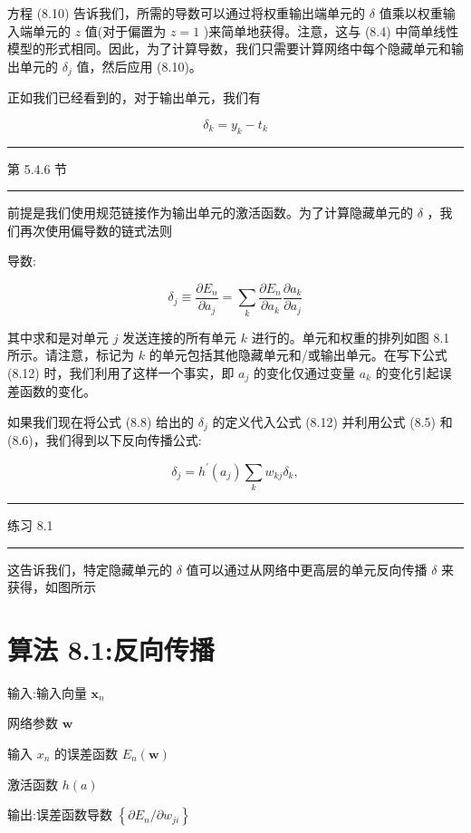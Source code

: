 \documentclass[10pt]{article}
\newcommand{\HRule}{\begin{center}\rule{0.9\linewidth}{0.2mm}\end{center}}
\begin{document}
方程 (8.10) 告诉我们，所需的导数可以通过将权重输出端单元的 \(\delta\) 值乘以权重输入端单元的 \(z\) 值(对于偏置为 \(z = 1\) )来简单地获得。注意，这与 (8.4) 中简单线性模型的形式相同。因此，为了计算导数，我们只需要计算网络中每个隐藏单元和输出单元的 \({\delta }_{j}\) 值，然后应用 (8.10)。

正如我们已经看到的，对于输出单元，我们有

\[
{\delta }_{k} = {y}_{k} - {t}_{k} \tag{8.11}
\]

\HRule

第 5.4.6 节

\HRule

前提是我们使用规范链接作为输出单元的激活函数。为了计算隐藏单元的 \(\delta\) ，我们再次使用偏导数的链式法则

导数:

\[
{\delta }_{j} \equiv  \frac{\partial {E}_{n}}{\partial {a}_{j}} = \mathop{\sum }\limits_{k}\frac{\partial {E}_{n}}{\partial {a}_{k}}\frac{\partial {a}_{k}}{\partial {a}_{j}} \tag{8.12}
\]

其中求和是对单元 \(j\) 发送连接的所有单元 \(k\) 进行的。单元和权重的排列如图 8.1 所示。请注意，标记为 \(k\) 的单元包括其他隐藏单元和/或输出单元。在写下公式 (8.12) 时，我们利用了这样一个事实，即 \({a}_{j}\) 的变化仅通过变量 \({a}_{k}\) 的变化引起误差函数的变化。

如果我们现在将公式 (8.8) 给出的 \({\delta }_{j}\) 的定义代入公式 (8.12) 并利用公式 (8.5) 和 (8.6)，我们得到以下反向传播公式:

\[
{\delta }_{j} = {h}^{\prime }\left( {a}_{j}\right) \mathop{\sum }\limits_{k}{w}_{kj}{\delta }_{k}, \tag{8.13}
\]

\HRule

练习 8.1

\HRule

这告诉我们，特定隐藏单元的 \(\delta\) 值可以通过从网络中更高层的单元反向传播 \(\delta\) 来获得，如图所示

\section*{算法 8.1:反向传播}

输入:输入向量 \({\mathbf{x}}_{n}\)

网络参数 \(\mathbf{w}\)

输入 \({x}_{n}\) 的误差函数 \({E}_{n}\left( \mathbf{w}\right)\)

激活函数 \(h\left( a\right)\)

输出:误差函数导数 \(\left\{  {\partial {E}_{n}/\partial {w}_{ji}}\right\}\)
\end{document}

